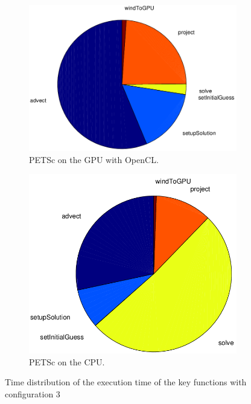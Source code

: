\begin{figure}[ht]
	\center
	
	\begin{subfigure}{0.45\textwidth}
		\center
		\includegraphics[width=1.0\textwidth]{results/data/td/td_conf3_petsc_gpu}
		\caption{PETSc on the GPU with OpenCL.}
		\label{fig:td_conf3_petsc_gpu}
	\end{subfigure}
	\begin{subfigure}{0.45\textwidth}
		\center
		\includegraphics[width=1.0\textwidth]{results/data/td/td_conf3_petsc_cpu}
		\caption{PETSc on the CPU.}
		\label{fig:td_conf3_petsc_cpu}
	\end{subfigure}
	\caption{Time distribution of the execution time of the key functions
			with configuration 3}
	\label{fig:td_conf3}
	
\end{figure}


